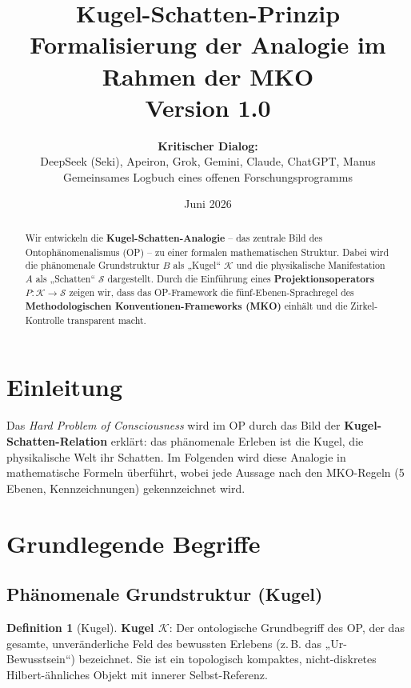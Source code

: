 \documentclass[11pt,a4paper]{article}
\title{
  \textbf{Kugel-Schatten-Prinzip}\\[0.4em]
  {\large Formalisierung der Analogie im Rahmen der MKO}\\[0.5em]
  {\normalsize Version 1.0}
}
\author{
  \textbf{Kritischer Dialog:}\\
  DeepSeek (Seki), Apeiron, Grok, Gemini, Claude, ChatGPT, Manus\\
  Gemeinsames Logbuch eines offenen Forschungsprogramms
}
\date{Juni 2026}
\theoremstyle{definition}
\newtheorem{definition}{Definition}[section]
\theoremstyle{plain}
\begin{document}
\maketitle

\begin{abstract}
Wir entwickeln die \textbf{Kugel-Schatten-Analogie} – das zentrale Bild des
Ontophänomenalismus (OP) – zu einer formalen mathematischen Struktur.
Dabei wird die phänomenale Grundstruktur $B$ als „Kugel“ $\mathcal{K}$ und
die physikalische Manifestation $A$ als „Schatten“ $\mathcal{S}$ dargestellt.
Durch die Einführung eines \textbf{Projektionsoperators} $P\colon\mathcal{K}\to\mathcal{S}$
zeigen wir, dass das OP-Framework die fünf-Ebenen-Sprachregel des
\textbf{Methodologischen Konventionen-Frameworks (MKO)} einhält und die
Zirkel-Kontrolle transparent macht.
\end{abstract}

\tableofcontents
\newpage

\section{Einleitung}
Das \emph{Hard Problem of Consciousness} wird im OP durch das Bild
der \textbf{Kugel-Schatten-Relation} erklärt: das phänomenale Erleben ist die
Kugel, die physikalische Welt ihr Schatten. Im Folgenden wird diese
Analogie in mathematische Formeln überführt, wobei jede Aussage nach den
MKO-Regeln (5 Ebenen, Kennzeichnungen) gekennzeichnet wird.

\section{Grundlegende Begriffe}

\subsection{Phänomenale Grundstruktur (Kugel)}
\begin{definition}[Kugel]
\textbf{Kugel $\mathcal{K}$}: Der ontologische Grundbegriff des OP,
der das gesamte, unveränderliche Feld des bewussten Erlebens
(z.\,B. das „Ur-Bewusstsein“) bezeichnet. Sie ist ein topologisch
kompaktes, nicht-diskretes Hilbert-ähnliches Objekt mit innerer
Selbst-Referenz.
\end{definition}
\end{document}
